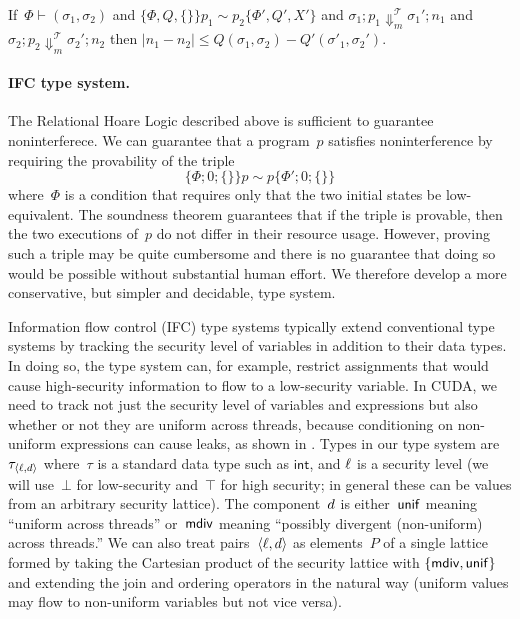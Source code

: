 \begin{theorem}\label{thm:logic-sound}
If~$\Phi \vdash (\sigma_1, \sigma_2)$ and
$\{\Phi, Q, \{\}\} p_1 \sim p_2 \{\Phi', Q', X'\}$
and $\sigma_1; p_1 \Downarrow^{\mathcal{T}}_m \sigma_1'; n_1$
and $\sigma_2; p_2 \Downarrow^{\mathcal{T}}_m \sigma_2'; n_2$
then $|n_1 - n_2| \leq Q(\sigma_1, \sigma_2) - Q'(\sigma'_1, \sigma_2')$.
\end{theorem}


\paragraph{IFC type system.}
The Relational Hoare Logic described above is sufficient to guarantee noninterferece.
%
We can guarantee that a program~$p$ satisfies noninterference by requiring the
provability of the triple
\[\{\Phi; 0; \{\}\} p \sim p \{\Phi'; 0; \{\}\}\]
where~$\Phi$ is a condition that requires only that the two initial states be low-equivalent.
%
The soundness theorem guarantees that if the triple is provable, then the two executions of~$p$ do not differ in their resource usage.
%
However, proving such a triple may be quite cumbersome and there is no guarantee that doing so would be possible without substantial human effort.
%
We therefore develop a more conservative, but simpler and decidable, type system.

Information flow control (IFC) type systems typically extend conventional type systems by tracking the security level of variables in addition to their data types.
%
In doing so, the type system can, for example, restrict assignments that would
cause high-security information to flow to a low-security variable.
%
In CUDA, we need to track not just the security level of variables and
expressions but also
whether or not they are uniform across threads, because conditioning on
non-uniform expressions can cause leaks, as shown in .
%
Types in our type system are~$\tau_{\langle \ell, d \rangle}$
where~$\tau$ is a standard data type such as $\mathsf{int}$, and
$\ell$ is a security level (we will use~$\bot$ for low-security and~$\top$
for high security; in general these can be values from an arbitrary security
lattice).
%
The component~$d$ is either~$\mathsf{unif}$ meaning ``uniform across
threads'' or~$\mathsf{mdiv}$ meaning ``possibly divergent (non-uniform) across threads.''
%
We can also treat pairs~$\langle \ell, d \rangle$ as elements~$P$ of a
single lattice formed by taking the Cartesian product of the security
lattice with $\{\mathsf{mdiv}, \mathsf{unif}\}$ and extending the join and ordering operators
in the natural way (uniform values may flow to non-uniform variables but not
vice versa).

